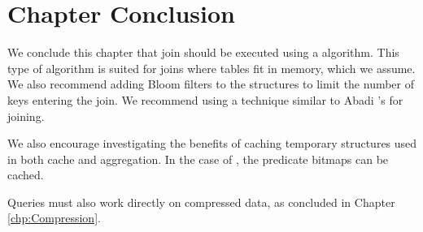 \section{Chapter Conclusion}
\label{sec:Chapter Conclusion}
We conclude this chapter that join should be executed using a  algorithm. This type of algorithm is suited for joins where tables fit in memory, which we assume. We also recommend adding Bloom filters to the structures to limit the number of keys entering the join. We recommend using a technique similar to Abadi \ea's  for joining.

We also encourage investigating the benefits of caching temporary structures used in both cache and aggregation. In the case of , the predicate bitmaps can be cached.

Queries must also work directly on compressed data, as concluded in Chapter \ref{chp:Compression}.
